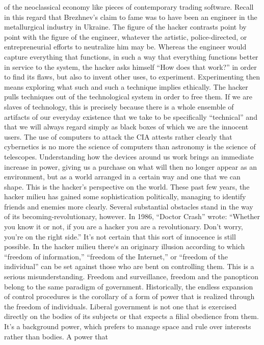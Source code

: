 \documentclass[landscape,twocolumn,letterpaper]{article}
\begin{document}
of the neoclassical economy like pieces of contemporary trading
software. Recall in this regard that Brezhnev’s claim to fame was to
have been an engineer in the metallurgical industry in Ukraine. The
figure of the hacker contrasts point by point with the figure of the
engineer, whatever the artistic, police-directed, or entrepreneurial
efforts to neutralize him may be. Whereas the engineer would capture
everything that functions, in such a way that everything functions
better in service to the system, the hacker asks himself “How does
that work?”  in order to find its flaws, but also to invent other
uses, to experiment. Experimenting then means exploring what such and
such a technique implies ethically. The hacker pulls techniques out of
the technological system in order to free them. If we are slaves of
technology, this is precisely because there is a whole ensemble of
artifacts of our everyday existence that we take to be specifically
“technical” and that we will always regard simply as black boxes of
which we are the innocent users. The use of computers to attack the
CIA attests rather clearly that cybernetics is no more the science of
computers than astronomy is the science of telescopes. Understanding
how the devices around us work brings an immediate increase in power,
giving us a purchase on what will then no longer appear as an
environment, but as a world arranged in a certain way and one that we
can shape. This is the hacker’s perspective on the world. These past
few years, the hacker milieu has gained some sophistication
politically, managing to identify friends and enemies more
clearly. Several substantial obstacles stand in the way of its
becoming-revolutionary, however. In 1986, “Doctor Crash” wrote:
“Whether you know it or not, if you are a hacker you are a
revolutionary. Don’t worry, you’re on the right side.” It’s not
certain that this sort of innocence is still possible. In the hacker
milieu there‘s an originary illusion according to which “freedom of
information,” “freedom of the Internet,” or “freedom of the
individual” can be set against those who are bent on controlling
them. This is a serious misunderstanding. Freedom and surveillance,
freedom and the panopticon belong to the same paradigm of
government. Historically, the endless expansion of control procedures
is the corollary of a form of power that is realized through the
freedom of individuals. Liberal government is not one that is
exercised directly on the bodies of its subjects or that expects a
filial obedience from them. It’s a background power, which prefers to
manage space and rule over interests rather than bodies. A power that
\end{document}
